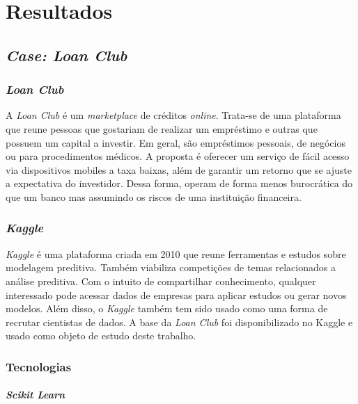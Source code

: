 \part{Resultados}

\chapter{\emph{Case: Loan Club}}

\section{\emph{Loan Club}}

A \emph{Loan Club} é um \emph{marketplace} de créditos \emph{online}. Trata-se de uma plataforma que reune pessoas que gostariam de realizar um empréstimo e outras que possuem um capital a investir. Em geral, são empréstimos pessoais, de negócios ou para procedimentos médicos. A proposta é oferecer um serviço de fácil acesso via dispositivos mobiles a taxa baixas, além de garantir um retorno que se ajuste a expectativa do investidor. Dessa forma, operam de forma menos burocrática do que um banco mas assumindo os riscos de uma instituição financeira.

\section{\emph{Kaggle}}

\emph{Kaggle} é uma plataforma criada em 2010 que reune ferramentas e estudos sobre modelagem preditiva. Também viabiliza competições de temas relacionados a análise preditiva. Com o intuito de compartilhar conhecimento, qualquer interessado pode acessar dados de empresas para aplicar estudos ou gerar novos modelos. Além disso, o \emph{Kaggle} também tem sido usado como uma forma de recrutar cientistas de dados. A base da \emph{Loan Club} foi disponibilizado no Kaggle e usado como objeto de estudo deste trabalho.

\section{Tecnologias}

\subsection{\emph{Scikit Learn}}

